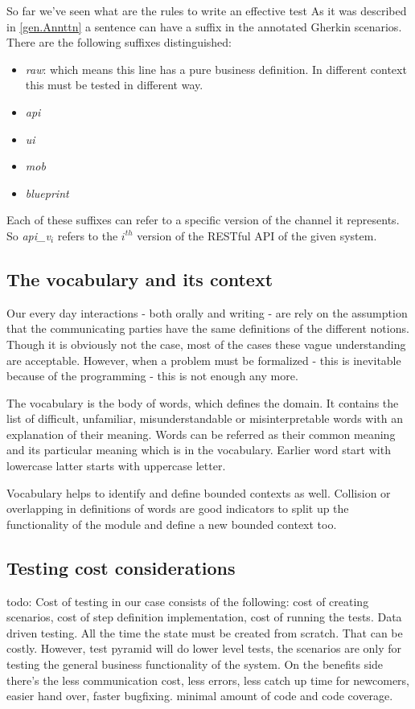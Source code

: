 \documentclass[conference]{IEEEtran}
\begin{document}
So far we've seen what are the rules to write an effective test
As it was described in \ref{gen.Annttn} a sentence can have a suffix in the annotated Gherkin scenarios.
There are the following suffixes distinguished:
    \begin{itemize}
        \item \textit{raw}: which means this line has a pure business definition. In different context this must be tested in different way.
        \item \textit{api}
        \item \textit{ui}
        \item \textit{mob}
        \item \textit{blueprint}
    \end{itemize}

Each of these suffixes can refer to a specific version of the channel it represents. So \textit{api\_v\(_{i}\)} refers to the \(i^{th}\) version of the RESTful API of the given system.

\subsection{The vocabulary and its context}
Our every day interactions - both orally and writing - are rely on the assumption that the communicating parties have the same definitions of the different notions. Though it is obviously not the case, most of the cases these vague understanding are acceptable. However, when a problem must be formalized - this is inevitable because of the programming - this is not enough any more.

The vocabulary is the body of words, which defines the domain. It contains the list of difficult, unfamiliar, misunderstandable or misinterpretable words with an explanation of their meaning. Words can be referred as their common meaning and its particular meaning which is in the vocabulary. Earlier word start with lowercase latter starts with uppercase letter.

Vocabulary helps to identify and define bounded contexts as well. Collision or overlapping in definitions of words are good indicators to split up the functionality of the module and define a new bounded context too.

\subsection{Testing cost considerations}
todo:
Cost of testing in our case consists of the following: cost of creating scenarios, cost of step definition implementation, cost of running the tests. Data driven testing. All the time the state must be created from scratch. That can be costly. However, test pyramid will do lower level tests, the scenarios are only for testing the general business functionality of the system.
On the benefits side there's the less communication cost, less errors, less catch up time for newcomers, easier hand over, faster bugfixing.
minimal amount of code and code coverage.
\end{document}
